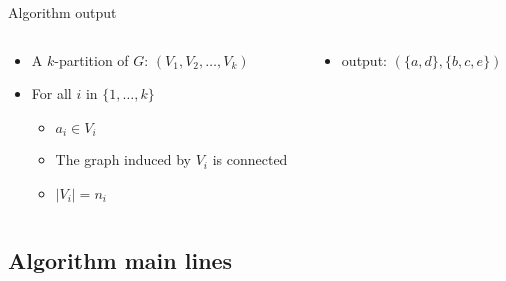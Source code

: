 \begin{frame}{Algorithm output}
  \begin{columns}[c]
    \begin{column}[T]{.5\textwidth}
      \begin{itemize}
      \item A $k$-partition of $G$: $(V_1,V_2, \dots, V_k)$
      \item For all $i$ in $\{1, \dots, k\}$
        \begin{itemize}
        \item $a_i \in V_i$
        \item The graph induced by $V_i$ is connected
        \item $|V_i| = n_i$
        \end{itemize}
      \end{itemize}
    \end{column}
    \begin{column}[T]{.5\textwidth}
      \begin{itemize}
      \item output: $(\{a,d\},\{b,c,e\})$
      \end{itemize}
      \begin{tikzpicture}[scale=0.5]
        
      \end{tikzpicture}
    \end{column}
  \end{columns}
\end{frame}

\subsection{Algorithm main lines}

